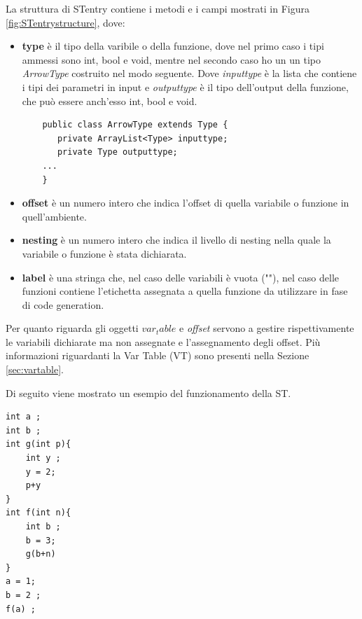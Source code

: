 La struttura di STentry contiene i metodi e i campi mostrati in Figura \ref{fig:STentrystructure}, dove:
\begin{itemize}
    \item \textbf{type} è il tipo della varibile o della funzione, dove nel primo caso i tipi ammessi sono int, bool e void, mentre nel secondo caso ho un un tipo \textit{ArrowType} costruito nel modo seguente. Dove \textit{inputtype} è la lista che contiene i tipi dei parametri in input e \textit{outputtype} è il tipo dell'output della funzione, che può essere anch'esso int, bool e void.
    \begin{verbatim}
    public class ArrowType extends Type {
	   private ArrayList<Type> inputtype; 
	   private Type outputtype;
    ...
    }
    \end{verbatim}
    \item \textbf{offset} è un numero intero che indica l'offset di quella variabile o funzione in quell'ambiente.
    \item \textbf{nesting} è un numero intero che indica il livello di nesting nella quale la variabile o funzione è stata dichiarata.
    \item \textbf{label} è una stringa che, nel caso delle variabili è vuota (""), nel caso delle funzioni contiene l'etichetta assegnata a quella funzione da utilizzare in fase di code generation.
\end{itemize}

Per quanto riguarda gli oggetti \textit{$var_table$} e \textit{offset} servono a gestire rispettivamente le variabili dichiarate ma non assegnate e l'assegnamento degli offset. Più informazioni riguardanti la Var Table (VT) sono presenti nella Sezione \ref{sec:vartable}.

Di seguito viene mostrato un esempio del funzionamento della ST.

\begin{verbatim}
int a ;
int b ;
int g(int p){
    int y ;
    y = 2;
    p+y
}
int f(int n){
    int b ;
    b = 3;
    g(b+n)
}
a = 1;
b = 2 ;
f(a) ;
\end{verbatim}

